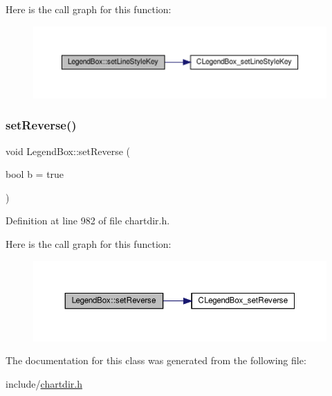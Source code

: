 Here is the call graph for this function\+:
\nopagebreak
\begin{figure}[H]
\begin{center}
\leavevmode
\includegraphics[width=350pt]{class_legend_box_ad358e74944257702f9099c7c41f936e5_cgraph}
\end{center}
\end{figure}
\mbox{\label{class_legend_box_ad4f86eedf77eff607627c7bef5bf92a9}} 
\subsubsection{\texorpdfstring{set\+Reverse()}{setReverse()}}
{\footnotesize\ttfamily void Legend\+Box\+::set\+Reverse (\begin{DoxyParamCaption}\item[{bool}]{b = {\ttfamily true} }\end{DoxyParamCaption})\hspace{0.3cm}{\ttfamily [inline]}}



Definition at line 982 of file chartdir.\+h.

Here is the call graph for this function\+:
\nopagebreak
\begin{figure}[H]
\begin{center}
\leavevmode
\includegraphics[width=350pt]{class_legend_box_ad4f86eedf77eff607627c7bef5bf92a9_cgraph}
\end{center}
\end{figure}


The documentation for this class was generated from the following file\+:\begin{DoxyCompactItemize}
\item 
include/\hyperlink{chartdir_8h}{chartdir.\+h}\end{DoxyCompactItemize}
